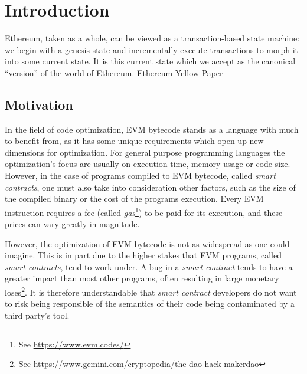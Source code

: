 \chapter{Introduction}
\label{cap:introduction}

\chapterquote
{Ethereum, taken as a whole, can be viewed as a transaction-based state machine: we begin with a genesis state and incrementally execute transactions to morph it into some current state. It is this current state which we accept as the canonical “version” of the world of Ethereum.}
{Ethereum Yellow Paper}

\section{Motivation}
\label{sect:motivation}



In the field of code optimization, EVM bytecode stands as a language with much to benefit from, as it
has some unique requirements which open up new dimensions for optimization. For general purpose
programming languages the optimization's focus are usually on execution time, memory usage or code size.
However, in the case of programs compiled to EVM bytecode, called \emph{smart contracts}, one must also
take into consideration other factors, such as the size of the compiled binary or the cost of the
programs execution. Every EVM instruction requires a fee (called \emph{gas}\footnote{See 
\url{https://www.evm.codes/}}) to be paid for its execution, and these prices can vary greatly in 
magnitude.


However, the optimization of EVM bytecode is not as widespread as one could imagine. This is in part
due to the higher stakes that EVM programs, called \emph{smart contracts}, tend to work under. A bug
in a \emph{smart contract} tends to have a greater impact than most other programs, often resulting
in large monetary loses\footnote{See \url{https://www.gemini.com/cryptopedia/the-dao-hack-makerdao}}.
It is therefore understandable that \emph{smart contract} developers do not want to risk
being responsible of the semantics of their code being contaminated by a third party's tool.

